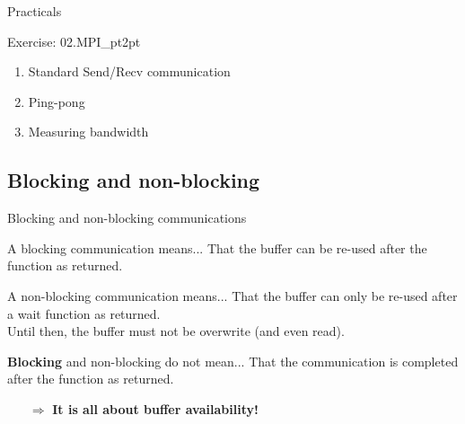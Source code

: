 \documentclass[aspectratio=43]{beamer}
\begin{document}
\begin{frame}{Practicals}
    \begin{brown2block}{Exercise: 02.MPI\_pt2pt}
    \begin{enumerate}
    \item  Standard Send/Recv communication
    \item  Ping-pong
    \item  Measuring bandwidth
    \end{enumerate}
    \end{brown2block}
\end{frame}

\subsection{Blocking and non-blocking}
\begin{frame}{Blocking and non-blocking communications}
\begin{green1block}{A blocking communication means...}
    That the buffer can be re-used after the function as returned.
\end{green1block}
\begin{green1block}{A non-blocking communication means...}
    That the buffer can only be re-used after a wait function as returned.\\
    Until then, the buffer must not be overwrite (and even read).
\end{green1block}
\begin{red1block}{\textbf{Blocking} and non-blocking do not mean...}
    That the communication is completed after the function as returned.
\end{red1block}
\begin{itemize}
    \item[\color{cscsred}$\Rightarrow$]\color{cscsred}\textbf{It is all about buffer availability!}
\end{itemize}
\end{frame}
\end{document}
